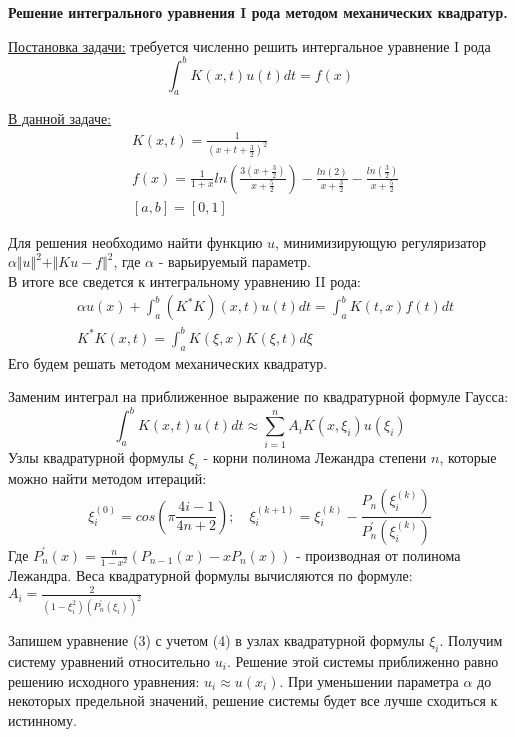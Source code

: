 \documentclass[a4paper,12pt]{report}
\begin{document}
\begin{center}
\Large
{\bf Решение интегрального уравнения I рода методом механических квадратур.}
\end{center}

\underline{Постановка задачи:} требуется численно решить интергальное уравнение I рода
\begin{equation}
\int_a^b K(x,t)u(t)dt = f(x)
\end{equation}

\underline{В данной задаче:}
\begin{equation}
\begin{aligned}
& K(x,t) = \frac{1}{(x + t + \frac{3}{2})^2} \\
& f(x) = \frac{1}{1+x}ln(\frac{3(x+\frac{3}{2})}{x+\frac{5}{2}}) - \frac{ln(2)}{x+\frac{3}{2}} - \frac{ln(\frac{3}{2})}{x+\frac{5}{2}}\\
& [a,b] = [0,1]
\end{aligned}
\end{equation}

Для решения необходимо найти функцию $u$, минимизирующую регуляризатор $\alpha \Vert u \Vert^2 + \Vert Ku - f \Vert^2$, где $\alpha$ - варьируемый параметр. \\
В итоге все сведется к интегральному уравнению II рода:
\begin{equation}
\begin{aligned}
& \alpha u(x) + \int_a^b (K^{*}K)(x,t)u(t)dt = \int_a^b K(t,x)f(t)dt\\
& K^{*}K(x,t) = \int_a^b K(\xi,x)K(\xi,t)d\xi
\end{aligned}
\end{equation}
Его будем решать методом механических квадратур.\newline

Заменим интеграл на приближенное выражение по квадратурной формуле Гаусса:
\begin{equation}
\int_a^b K(x,t)u(t)dt \approx \sum_{i=1}^n A_i K(x,\xi_i)u(\xi_i)
\end{equation}
Узлы квадратурной формулы $\xi_i$ - корни полинома Лежандра степени $n$, которые можно найти методом итераций:
\begin{equation}
\xi_i^{(0)} = cos(\pi \frac{4i-1}{4n+2}); \quad \xi_i^{(k+1)} = \xi_i^{(k)} - \frac{P_n(\xi_i^{(k)})}{P_n^\prime(\xi_i^{(k)})}
\end{equation}
Где $P_n^\prime(x) = \frac{n}{1-x^2}(P_{n-1}(x) - xP_n(x))$ - производная от полинома Лежандра.
Веса квадратурной формулы вычисляются по формуле: $A_i = \frac{2}{(1-\xi_i^2)(P_n^\prime(\xi_i))^2}$ \newline

Запишем уравнение (3) с учетом (4) в узлах квадратурной формулы $\xi_i$. Получим систему уравнений относительно $u_i$. Решение этой системы приближенно равно решению исходного уравнения: 
$u_i \approx u(x_i)$. При уменьшении параметра $\alpha$ до некоторых предельной значений, решение системы будет все лучше сходиться к истинному.
\end{document}
